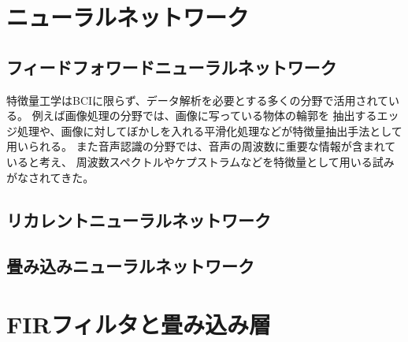 

\section{ニューラルネットワーク}

\subsection{フィードフォワードニューラルネットワーク}
特徴量工学はBCIに限らず、データ解析を必要とする多くの分野で活用されている。
例えば画像処理の分野では、画像に写っている物体の輪郭を
抽出するエッジ処理や、画像に対してぼかしを入れる平滑化処理などが特徴量抽出手法として用いられる。
また音声認識の分野では、音声の周波数に重要な情報が含まれていると考え、
周波数スペクトルやケプストラムなどを特徴量として用いる試みがなされてきた。

\subsection{リカレントニューラルネットワーク}

\subsection{畳み込みニューラルネットワーク}

\section{FIRフィルタと畳み込み層}